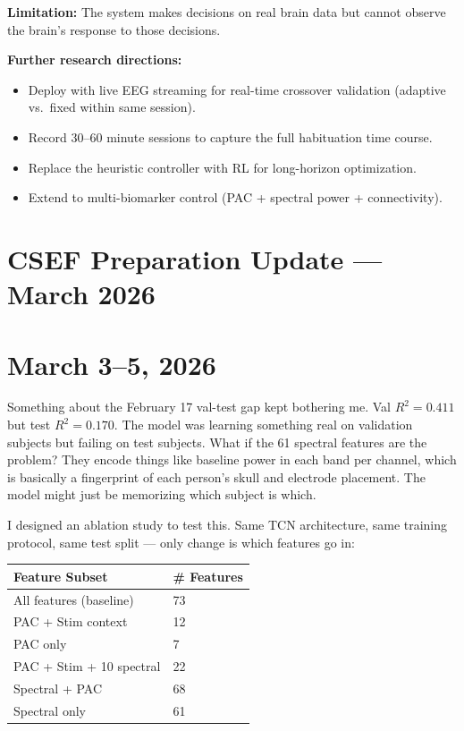 \documentclass[11pt,letterpaper]{article}
\begin{document}
\textbf{Limitation:} The system makes decisions on real brain data but cannot observe the
brain's response to those decisions.

\textbf{Further research directions:}
\begin{itemize}[noitemsep]
  \item Deploy with live EEG streaming for real-time crossover validation (adaptive vs.\ fixed
        within same session).
  \item Record 30--60 minute sessions to capture the full habituation time course.
  \item Replace the heuristic controller with RL for long-horizon optimization.
  \item Extend to multi-biomarker control (PAC + spectral power + connectivity).
\end{itemize}

\section*{CSEF Preparation Update --- March 2026}

\section*{March 3--5, 2026}

Something about the February 17 val-test gap kept bothering me. Val $R^2 = 0.411$ but test
$R^2 = 0.170$. The model was learning something real on validation subjects but failing on
test subjects. What if the 61 spectral features are the problem? They encode things like
baseline power in each band per channel, which is basically a fingerprint of each person's
skull and electrode placement. The model might just be memorizing which subject is which.

I designed an ablation study to test this. Same TCN architecture, same training protocol,
same test split --- only change is which features go in:

\vspace{0.5em}
\begin{tabular}{@{}ll@{}}
\toprule
\textbf{Feature Subset}         & \textbf{\# Features} \\
\midrule
All features (baseline)         & 73 \\
PAC + Stim context              & 12 \\
PAC only                        & 7  \\
PAC + Stim + 10 spectral        & 22 \\
Spectral + PAC                  & 68 \\
Spectral only                   & 61 \\
\bottomrule
\end{tabular}
\vspace{0.5em}
\end{document}
